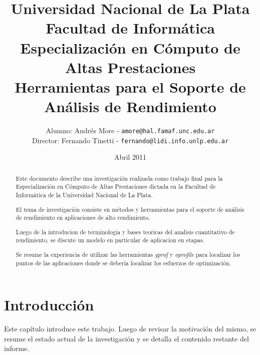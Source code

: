 \documentclass[a4paper]{report}
\begin{document}
\title{
  Universidad Nacional de La Plata\\Facultad de Inform\'atica\\
  \bigskip
  Especializaci\'on en C\'omputo de Altas Prestaciones\\
  \bigskip
  Herramientas para el Soporte de An\'alisis de Rendimiento
}

\author{
  Alumno: Andr\'es More - {\tt amore@hal.famaf.unc.edu.ar}\\
  Director: Fernando Tinetti - {\tt fernando@lidi.info.unlp.edu.ar}
}

\date{Abril 2011}

\maketitle

\begin{abstract}

  Este documento describe una investigaci\'on realizada como trabajo final para
  la Especializaci\'on en C\'omputo de Altas Prestaciones dictada en la Facultad
  de Inform\'atica de la Universidad Nacional de La Plata.

  \bigskip

  El tema de investigaci\'on consiste en m\'etodos y herramientas para el soporte
  de an\'alisis de rendimiento en aplicaciones de alto rendimiento.

  \bigskip

  Luego de la introducion de terminologia y bases teoricas del analisis cuantitativo
  de rendimiento, se discute un modelo en particular de aplicacion en etapas.

  \bigskip

  Se resume la experiencia de utilizar las herramientas {\it gprof} y {\it oprofile}
  para localizar los puntos de las aplicaciones donde se deber\'ia localizar los
  esfuerzos de optimizaci\'on.

\end{abstract}

\tableofcontents

\chapter{Introducci\'on}

Este cap\'itulo introduce este trabajo. Luego de revisar la motivaci\'on del mismo,
se resume el estado actual de la investigaci\'on y se detalla el contenido restante
del informe.
\end{document}
